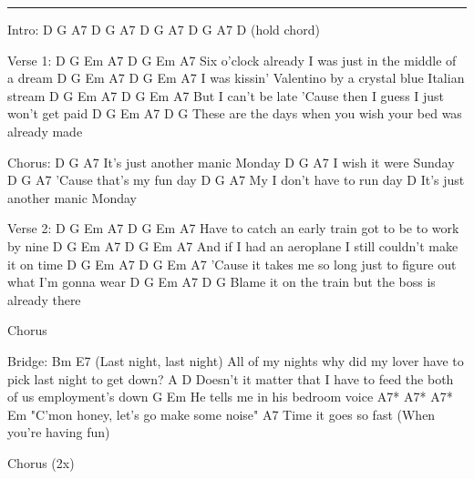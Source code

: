 \noindent\rule{\columnwidth}{1pt}

\begin{lstsong}
Intro: D  G  A7  D  G  A7 D  G  A7 D  G  A7   D (hold chord)

Verse 1:
D           G              Em          A7          D     G   Em   A7
Six o'clock already I was just in the middle of a dream
        D        G           Em             A7      D        G   Em   A7
I was kissin' Valentino by a crystal blue Italian stream
       D        G                 Em            A7        D     G  Em   A7
But I can't be late 'Cause then I guess I just won't get paid
D             G              Em               A7       D        G
These are the days when you wish your bed was already made

Chorus:
                        D        G      A7
It's just another manic Monday
                D        G      A7
I wish it were Sunday
                 D          G      A7
'Cause that's my fun day
                    D        G       A7
My I don't have to run day
                         D
It's just another manic Monday

Verse 2:
D                 G           Em          A7      D     G   Em   A7
Have to catch an early train got to be to work by nine
    D           G            Em            A7         D     G   Em   A7
And if I had an aeroplane I still couldn't make it on time
           D           G           Em               A7       D     G   Em  A7
'Cause it takes me so long just to figure out what I'm gonna wear
D                 G           Em       A7       D        G
Blame it on the train but the boss is already there

Chorus

Bridge:
Bm                                                   E7           (Last night, last night)
All of my nights why did my lover have to pick last night to get down?
   A                                                   D
Doesn't it matter that I have to feed the both of us employment's down
      G                        Em
He tells me in his bedroom voice
           A7*   A7*   A7*        Em
"C'mon honey, let's go make some noise"
   A7
Time it goes so fast   (When you're having fun)

Chorus (2x)
\end{lstsong}
\newpage

